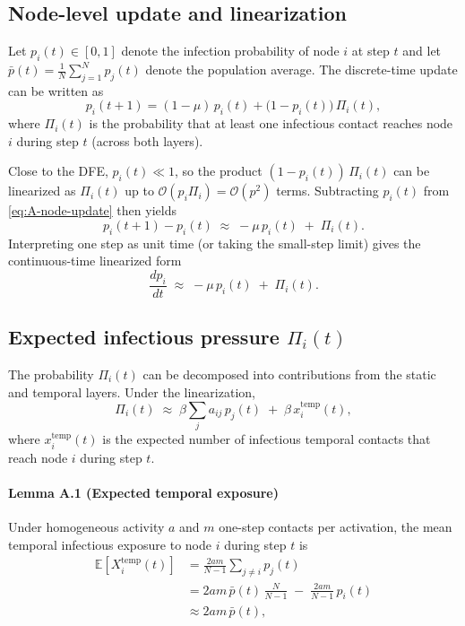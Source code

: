 \documentclass[pdflatex,sn-mathphys-num]{sn-jnl}%
\theoremstyle{thmstyleone}%
\theoremstyle{thmstyletwo}%
\theoremstyle{thmstylethree}%
\begin{document}
\begin{appendices}
\subsection{Node-level update and linearization}
Let $p_i(t)\in[0,1]$ denote the infection probability of node $i$ at step $t$ and let
$\bar p(t)=\tfrac1N \sum_{j=1}^N p_j(t)$ denote the population average. The
discrete-time update can be written as
\begin{equation}
  p_i(t+1)
  = (1-\mu)\,p_i(t) + \bigl(1-p_i(t)\bigr)\,\Pi_i(t),
  \label{eq:A-node-update}
\end{equation}
where $\Pi_i(t)$ is the probability that at least one infectious contact
reaches node $i$ during step $t$ (across both layers).

Close to the DFE, $p_i(t)\ll 1$, so the product $(1-p_i(t))\,\Pi_i(t)$ can be
linearized as $\Pi_i(t)$ up to $\mathcal{O}(p_i\Pi_i)=\mathcal{O}(p^2)$ terms.
Subtracting $p_i(t)$ from \eqref{eq:A-node-update} then yields
\begin{equation}
  p_i(t+1)-p_i(t)
  \;\approx\; -\mu\,p_i(t)\;+\;\Pi_i(t).
  \label{eq:A-difference}
\end{equation}
Interpreting one step as unit time (or taking the small-step limit) gives the
continuous-time linearized form
\begin{equation}
  \frac{dp_i}{dt}
  \;\approx\; -\mu\,p_i(t)\;+\;\Pi_i(t).
  \label{eq:A-ct}
\end{equation}

\subsection{Expected infectious pressure $\Pi_i(t)$}
The probability $\Pi_i(t)$ can be decomposed into contributions from the static
and temporal layers. Under the linearization,
\[
  \Pi_i(t)\;\approx\;\beta \sum_{j} a_{ij}\, p_j(t)\;+\;\beta\,x_i^{\text{temp}}(t),
\]
where $x_i^{\text{temp}}(t)$ is the expected number of infectious temporal
contacts that reach node $i$ during step $t$.

\paragraph{Lemma A.1 (Expected temporal exposure)}
Under homogeneous activity $a$ and $m$ one-step contacts per activation,
the mean temporal infectious exposure to node $i$ during step $t$ is
\begin{equation}
\begin{aligned}
  \mathbb{E}\!\left[X_i^{\mathrm{temp}}(t)\right]
  &= \frac{2am}{N-1}\sum_{j\ne i} p_j(t) \\[4pt]
  &= 2am\,\bar p(t)\,\frac{N}{N-1}
     \;-\; \frac{2am}{N-1}\,p_i(t) \\[4pt]
  &\approx 2am\,\bar p(t),
\end{aligned}
\label{eq:A-2am}
\end{equation}


\end{appendices}
\end{document}
